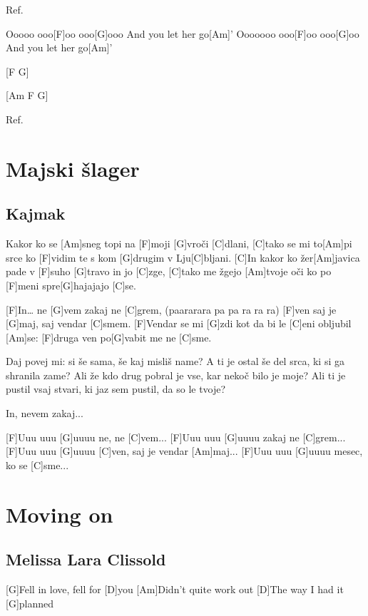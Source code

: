 \documentclass[a4paper,12pt]{article}
\begin{document}
\begin{multicols}{2}
\begin{guitar}
Ref.



Ooooo ooo[F]oo ooo[G]ooo
And you let her go[Am]'
Ooooooo ooo[F]oo ooo[G]oo
And you let her go[Am]'



[F    G]

[Am    F    G]



Ref.

\end{guitar}
\section{Majski šlager}
\subsection*{Kajmak}
\begin{guitar}
[C]Kakor ko se [Am]sneg topi na [F]moji [G]vroči [C]dlani, 
[C]tako se mi to[Am]pi srce ko 
[F]vidim te s kom [G]drugim v Lju[C]bljani. 
[C]In kakor ko žer[Am]javica pade v 
[F]suho [G]travo in jo [C]zge, 
[C]tako me žgejo [Am]tvoje oči ko po 
[F]meni spre[G]hajajajo [C]se.


[F]In…	ne [G]vem zakaj ne [C]grem, 
(paararara pa pa ra ra ra) 
[F]ven saj je [G]maj, saj vendar [C]smem. 
[F]Vendar se mi [G]zdi kot da bi le [C]eni obljubil [Am]se: 
[F]druga ven po[G]vabit me ne [C]sme. 


Daj povej mi: si še sama, 
še kaj misliš name? 
A ti je ostal še del srca, 
ki si ga shranila zame? 
Ali že kdo drug pobral je vse, 
kar nekoč bilo je moje?
Ali ti je pustil vsaj stvari, 
ki jaz sem pustil, da so le tvoje? 


In, nevem zakaj... 


[F]Uuu uuu [G]uuuu ne, ne [C]vem... 
[F]Uuu uuu [G]uuuu zakaj ne [C]grem... 
[F]Uuu uuu [G]uuuu [C]ven, saj je vendar [Am]maj... 
[F]Uuu uuu [G]uuuu mesec, ko se [C]sme... 

\end{guitar}
\section{Moving on}
\subsection*{Melissa Lara Clissold}
\begin{guitar}
[G D Am D G]

[G]Fell in love, fell for [D]you
[Am]Didn't quite work out
[D]The way I had it [G]planned


\end{guitar}
\end{multicols}
\end{document}
